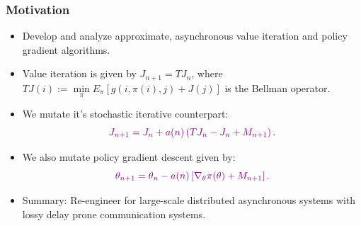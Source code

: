 \documentclass{beamer}
\begin{document}
\begin{frame}
  \frametitle{Motivation}
  \begin{itemize}
  \item {\color{blue} Develop and analyze approximate, asynchronous value iteration and 
  policy gradient algorithms}.
  \item Value iteration is given by $J_{n+1} = T J_n$, where
  $TJ(i) := \min \limits_{\pi} E_\pi \left[ g(i,\pi(i),j)+ J(j) \right]$ is the Bellman operator.
  \item We mutate it's stochastic iterative counterpart:
   \[
    {\color{violet}J_{n+1} = J_{n} + a(n) \left( TJ_n - J_n + M_{n+1}\right).}
   \]
   \item We also mutate policy gradient descent given by:
   \[
   {\color{violet}\theta_{n+1} = \theta_n  - a(n) \left[ \nabla_\theta \pi(\theta) + M_{n+1} \right].}
   \]
   \item {\color{blue}Summary}: Re-engineer for large-scale distributed asynchronous systems
   with lossy delay prone communication systems.
  \end{itemize}
 \end{frame}
\end{document}
